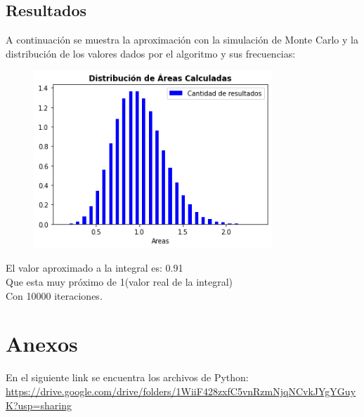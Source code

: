 \documentclass[a4paper,12pt]{article}
\begin{document}
\subsection{Resultados}
A continuación se muestra la aproximación con la simulación de Monte Carlo y 
la distribución de los valores dados por el algoritmo y sus frecuencias:
\begin{figure}[h]
    \centering
    \includegraphics[width=0.8\textwidth]{ejer6.png}
\end{figure}

El valor aproximado a la integral es: 0.91\\
Que esta muy próximo de 1(valor real de la integral)\\
Con 10000 iteraciones.
\section{Anexos}
En el siguiente link se encuentra los archivos de Python:\\
\url{https://drive.google.com/drive/folders/1WiiF428zxfC5vnRzmNjqNCvkJYgYGuyK?usp=sharing}
\end{document}
